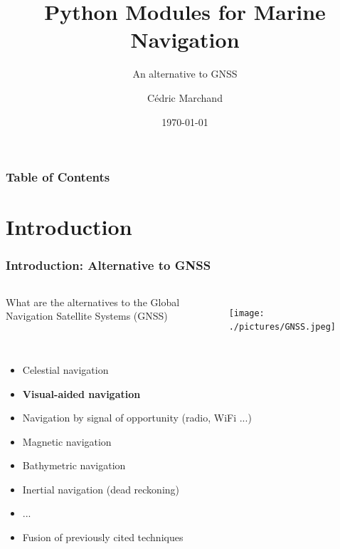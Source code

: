 \documentclass{beamer}
\title[Python navigation] %
{Python Modules for Marine Navigation}
\subtitle{An alternative to GNSS}
\author[Cédric MARCHAND] %
{Cédric Marchand}
\institute[Lab-STICC] %
{
  Lab-STICC, Université de Bretagne Sud
}
\date[\today] {\today}
\begin{document}
\frame{\titlepage}


\begin{frame}
\frametitle{Table of Contents}
\tableofcontents
\end{frame}



\section{Introduction}

\begin{frame}
\frametitle{Introduction: Alternative to GNSS}
    \begin{columns}
        What are the alternatives to the Global Navigation Satellite Systems (GNSS)
        \begin{figure}[h]
        \centering
        \texttt{[image: ./pictures/GNSS.jpeg]}
        \end{figure}
    \end{columns}
    
    \begin{itemize}
        \item Celestial navigation
        \item \textbf{Visual-aided navigation}
        \item Navigation by signal of opportunity (radio, WiFi ...)
        \item Magnetic navigation
        \item Bathymetric navigation
        \item Inertial navigation (dead reckoning)
        \item ...
        \item Fusion of previously cited techniques
    \end{itemize}
\end{frame}
\end{document}
